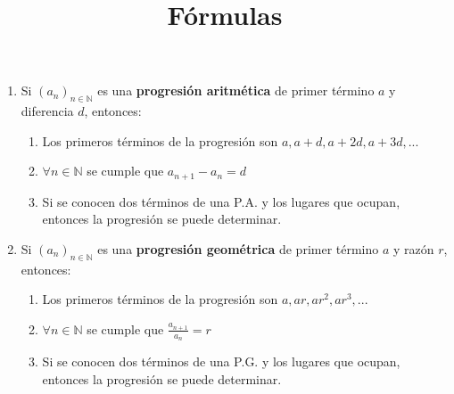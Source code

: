 \documentclass[12pt]{article}
\newcommand{\D}{\displaystyle}
\begin{document}
\pagebreak
\title{\LARGE{\textbf{F\'ormulas}}}
\maketitle
\begin{enumerate}
      \item Si $\D (a_n)_{n \in \mathbb{N}}$ es una \textbf{progresi\'on aritm\'etica} de
            primer t\'ermino $a$ y diferencia $d$, entonces:
            \begin{enumerate}
                  \item Los primeros t\'erminos de la progresi\'on son $a, a+d, a+2d, a+3d, ...$
                  \item $\forall n \in \mathbb{N}$ se cumple que $a_{n+1}-a_n = d$
                  \item Si se conocen dos t\'erminos de una P.A. y los lugares que ocupan, entonces la progresi\'on
                        se puede determinar.
            \end{enumerate}
      \item Si $\D (a_n)_{n \in \mathbb{N}}$ es una \textbf{progresi\'on geom\'etrica} de
            primer t\'ermino $a$ y raz\'on $r$, entonces:
            \begin{enumerate}
                  \item Los primeros t\'erminos de la progresi\'on son $a, ar, ar^2, ar^3, ...$
                  \item $\forall n \in \mathbb{N}$ se cumple que $\D \frac{a_{n+1}}{a_n} = r$
                  \item Si se conocen dos t\'erminos de una P.G. y los lugares que ocupan, entonces la progresi\'on
                        se puede determinar.
            \end{enumerate}
\end{enumerate}
\end{document}
